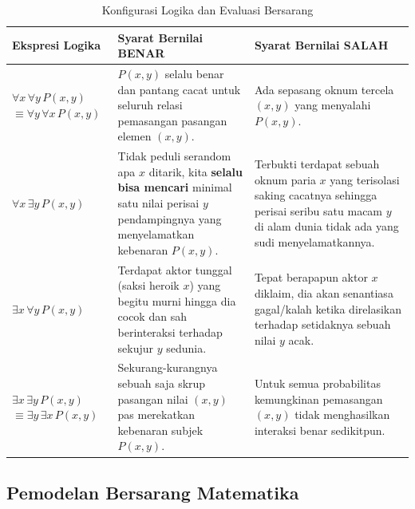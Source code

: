 \begin{table}[htbp]
\centering
\renewcommand{\arraystretch}{1.5}
\begin{tabular}{|p{3cm}|p{5.5cm}|p{5.5cm}|}
\hline
\textbf{Ekspresi Logika} & \textbf{Syarat Bernilai BENAR} & \textbf{Syarat Bernilai SALAH} \\ \hline

$\forall x \, \forall y \, P(x,y)$ 
\newline $\equiv \forall y \, \forall x \, P(x,y)$ & 
$P(x,y)$ selalu benar dan pantang cacat untuk seluruh relasi pemasangan pasangan elemen $(x, y)$. & 
Ada sepasang oknum tercela $(x,y)$ yang menyalahi $P(x,y)$. \\ \hline

$\forall x \, \exists y \, P(x,y)$ & 
Tidak peduli serandom apa $x$ ditarik, kita \textbf{selalu bisa mencari} minimal satu nilai perisai $y$ pendampingnya yang menyelamatkan kebenaran $P(x,y)$. & 
Terbukti terdapat sebuah oknum paria $x$ yang terisolasi saking cacatnya sehingga perisai seribu satu macam $y$ di alam dunia tidak ada yang sudi menyelamatkannya. \\ \hline

$\exists x \, \forall y \, P(x,y)$ & 
Terdapat aktor tunggal (saksi heroik $x$) yang begitu murni hingga dia cocok dan sah berinteraksi terhadap sekujur $y$ sedunia. & 
Tepat berapapun aktor $x$ diklaim, dia akan senantiasa gagal/kalah ketika direlasikan terhadap setidaknya sebuah nilai $y$ acak. \\ \hline

$\exists x \, \exists y \, P(x,y)$
\newline $\equiv \exists y \, \exists x \, P(x,y)$ & 
Sekurang-kurangnya sebuah saja skrup pasangan nilai $(x,y)$ pas merekatkan kebenaran subjek $P(x,y)$. & 
Untuk semua probabilitas kemungkinan pemasangan $(x,y)$ tidak menghasilkan interaksi benar sedikitpun. \\ \hline

\end{tabular}
\caption{Konfigurasi Logika dan Evaluasi Bersarang}
\end{table}

\subsection{Pemodelan Bersarang Matematika}

